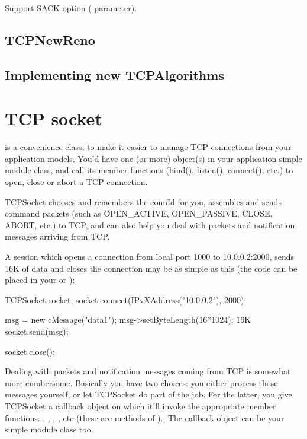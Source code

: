 Support SACK option ( parameter).

\subsection{TCPNewReno}

\subsection{Implementing new TCPAlgorithms}

\section{TCP socket}


 is a convenience class, to make it easier to manage TCP connections
from your application models. You'd have one (or more)  object(s)
in your application simple module class, and call its member functions
(bind(), listen(), connect(), etc.) to open, close or abort a TCP connection.

TCPSocket chooses and remembers the connId for you, assembles and sends command
packets (such as OPEN\_ACTIVE, OPEN\_PASSIVE, CLOSE, ABORT, etc.) to TCP,
and can also help you deal with packets and notification messages arriving
from TCP.

A session which opens a connection from local port 1000 to 10.0.0.2:2000,
sends 16K of data and closes the connection may be as simple as this
(the code can be placed in your  or
):

\begin{cpp}
TCPSocket socket;
socket.connect(IPvXAddress("10.0.0.2"), 2000);

msg = new cMessage("data1");
msg->setByteLength(16*1024);  16K
socket.send(msg);

socket.close();
\end{cpp}


Dealing with packets and notification messages coming from TCP is somewhat
more cumbersome. Basically you have two choices: you either process those
messages yourself, or let TCPSocket do part of the job. For the latter,
you give TCPSocket a callback object on which it'll invoke the appropriate
member functions: , ,
, ,
etc (these are methods of ).,
The callback object can be your simple module class too.

